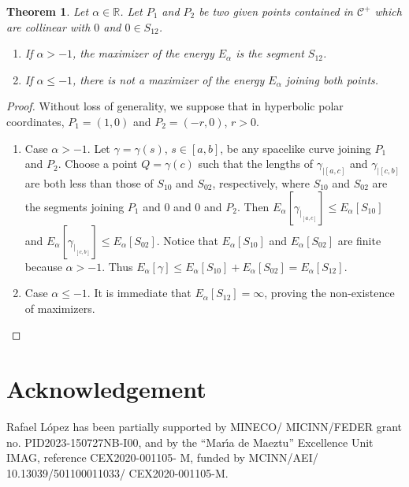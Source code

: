\documentclass[a4paper,12pt]{amsart}
\newtheorem{theorem}{Theorem}[section]
\theoremstyle{definition}
\def\r{\mathbb R}
\begin{document}
\begin{theorem}  
Let $\alpha\in\r$. Let $P_1$ and $P_2$ be two given points contained in $\mathcal{C}^+$ which are collinear with $0$ and $0\in S_{12}$. 
\begin{enumerate}
\item If $\alpha>-1$, the maximizer of the energy $E_\alpha$ is the segment $S_{12}$.
\item If $\alpha\leq -1$, there is not a maximizer of the energy $E_\alpha$ joining both points.
\end{enumerate}
\end{theorem}

\begin{proof} Without loss of generality, we suppose that in hyperbolic polar coordinates, $P_1=(1,0)$ and $P_2=(-r,0)$, $r>0$. 
\begin{enumerate}
\item Case $\alpha>-1$. Let $\gamma=\gamma(s)$, $s\in  [a,b]$, be any spacelike curve joining $P_1$ and $P_2$. Choose a point $Q=\gamma(c)$ such that the lengths of  $\gamma_{|[a,c]}$  and $\gamma_{|[c,b]}$ are both less than those of $S_{10}$ and $S_{02}$, respectively, where $S_{10}$ and $S_{02}$ are the segments joining $P_1$ and $0$ and $0$ and $P_2$.  Then $E_\alpha[\gamma_{|_{[a,c]}}]\leq E_\alpha[S_{10}]$ and $E_\alpha[\gamma_{|_{[c,b]}}]\leq E_\alpha[S_{02}]$. Notice that $E_\alpha[S_{10}]$ and $E_\alpha[S_{02}]$ are finite because $\alpha>-1$. Thus $E_\alpha[\gamma]\leq  E_\alpha[S_{10}]+E_\alpha[S_{02}]=E_\alpha[S_{12}]$.
\item Case $\alpha\leq -1$. It is immediate that $E_\alpha[S_{12}]=\infty$, proving the non-existence of maximizers.
\end{enumerate}
  
  \end{proof}
\section*{Acknowledgement}

 
 Rafael L\'opez   has been partially supported by MINECO/ MICINN/FEDER grant no. PID2023-150727NB-I00, and by the ``Mar\'{\i}a de Maeztu'' Excellence Unit IMAG, reference CEX2020-001105- M, funded by MCINN/AEI/ 10.13039/501100011033/ CEX2020-001105-M.
   
\end{document}
